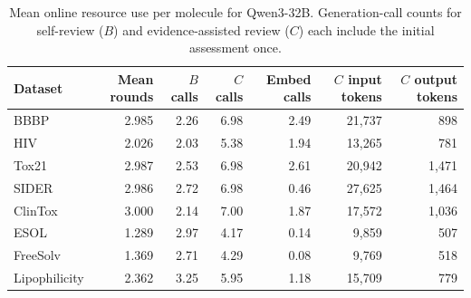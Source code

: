 \begin{table}[t]
\centering
\small
\begin{tabular}{lrrrrrr}
\toprule
\textbf{Dataset} & \textbf{Mean rounds} & \textbf{$B$ calls} & \textbf{$C$ calls} & \textbf{Embed calls} & \textbf{$C$ input tokens} & \textbf{$C$ output tokens} \\
\midrule
BBBP          & 2.985 & 2.26 & 6.98 & 2.49 & 21,737 & 898 \\
HIV           & 2.026 & 2.03 & 5.38 & 1.94 & 13,265 & 781 \\
Tox21         & 2.987 & 2.53 & 6.98 & 2.61 & 20,942 & 1,471 \\
SIDER         & 2.986 & 2.72 & 6.98 & 0.46 & 27,625 & 1,464 \\
ClinTox       & 3.000 & 2.14 & 7.00 & 1.87 & 17,572 & 1,036 \\
ESOL          & 1.289 & 2.97 & 4.17 & 0.14 & 9,859 & 507 \\
FreeSolv      & 1.369 & 2.71 & 4.29 & 0.08 & 9,769 & 518 \\
Lipophilicity & 2.362 & 3.25 & 5.95 & 1.18 & 15,709 & 779 \\
\bottomrule
\end{tabular}
\caption{Mean online resource use per molecule for Qwen3-32B. Generation-call counts for self-review ($B$) and evidence-assisted review ($C$) each include the initial assessment once.}
\label{tab:inference-budget-cost}
\end{table}


